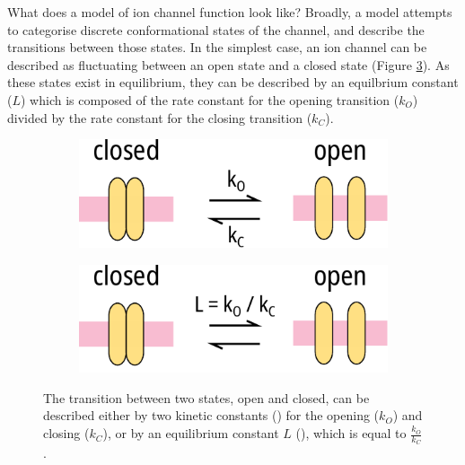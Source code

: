What does a model of ion channel function look like?
Broadly, a model attempts to categorise discrete conformational states of the channel, and describe the transitions between those states.
In the simplest case, an ion channel can be described as fluctuating between an open state and a closed state (Figure \ref{ch4fig:simple_model_diagram}).
As these states exist in equilibrium, they can be described by an equilbrium constant ($L$) which is composed of the rate constant for the opening transition ($k_O$) divided by the rate constant for the closing transition ($k_C$).

\begin{figure}[h]
	\centering
	\begin{subfigure}[t]{0.45\textwidth}
		\caption{}\label{ch4fig:simple_diag_1}
		\centering
		\includegraphics[width=\textwidth]{model_introduction_diagrams.pdf}
	\end{subfigure}
	\hfill
	\begin{subfigure}[t]{0.45\textwidth}
		\caption{}\label{ch4fig:simple_diag_2}
		\centering
		\includegraphics[width=\textwidth]{model_introduction_diagrams_2.pdf}
	\end{subfigure}
	\caption[Simple ion channel model]{
	The transition between two states, open and closed, can be described either by two kinetic constants () for the opening ($k_O$) and closing ($k_C$), or by an equilibrium constant $L$ (), which is equal to $\frac{k_O}{k_C}$.
	}\label{ch4fig:simple_model_diagram}
\end{figure}

